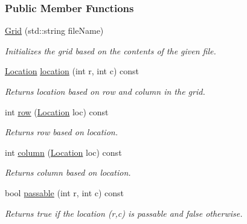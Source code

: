 \subsubsection*{Public Member Functions}
\begin{DoxyCompactItemize}
\item 
\hyperlink{structslb_1_1ext_1_1explicit__space_1_1Grid_a0f99334c0b664c55ed0b2a22a29d650a}{Grid} (std\+::string file\+Name)
\begin{DoxyCompactList}\small\item\em Initializes the grid based on the contents of the given file. \end{DoxyCompactList}\item 
\hyperlink{structslb_1_1ext_1_1explicit__space_1_1Grid_a2b2125f1774b299ea7f0f9f21d967fde}{Location} \hyperlink{structslb_1_1ext_1_1explicit__space_1_1Grid_a55b2b168ae56fb372304763478c4ca4b}{location} (int r, int c) const 
\begin{DoxyCompactList}\small\item\em Returns location based on row and column in the grid. \end{DoxyCompactList}\item 
int \hyperlink{structslb_1_1ext_1_1explicit__space_1_1Grid_acddf0950aadbbf55bc83f23b7ef4ed66}{row} (\hyperlink{structslb_1_1ext_1_1explicit__space_1_1Grid_a2b2125f1774b299ea7f0f9f21d967fde}{Location} loc) const 
\begin{DoxyCompactList}\small\item\em Returns row based on location. \end{DoxyCompactList}\item 
int \hyperlink{structslb_1_1ext_1_1explicit__space_1_1Grid_a0f91db20cb68595560b16235468289b9}{column} (\hyperlink{structslb_1_1ext_1_1explicit__space_1_1Grid_a2b2125f1774b299ea7f0f9f21d967fde}{Location} loc) const 
\begin{DoxyCompactList}\small\item\em Returns column based on location. \end{DoxyCompactList}\item 
bool \hyperlink{structslb_1_1ext_1_1explicit__space_1_1Grid_a574a12701271635e52714e53e3e88edd}{passable} (int r, int c) const 
\begin{DoxyCompactList}\small\item\em Returns {\ttfamily true} if the location {\ttfamily }(r,c) is passable and {\ttfamily false} otherwise. \end{DoxyCompactList}\item 

\end{DoxyCompactItemize}
